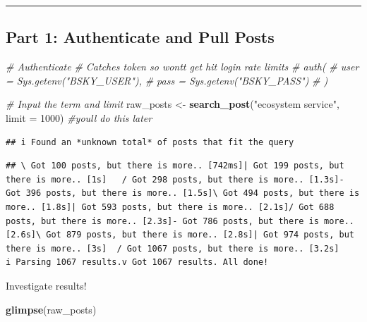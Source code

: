 \documentclass[
]{article}
\newenvironment{Shaded}{\begin{snugshade}}{\end{snugshade}}
\newcommand{\AttributeTok}[1]{\textcolor[rgb]{0.13,0.29,0.53}{#1}}
\newcommand{\CommentTok}[1]{\textcolor[rgb]{0.56,0.35,0.01}{\textit{#1}}}
\newcommand{\DecValTok}[1]{\textcolor[rgb]{0.00,0.00,0.81}{#1}}
\newcommand{\FunctionTok}[1]{\textcolor[rgb]{0.13,0.29,0.53}{\textbf{#1}}}
\newcommand{\NormalTok}[1]{#1}
\newcommand{\OtherTok}[1]{\textcolor[rgb]{0.56,0.35,0.01}{#1}}
\newcommand{\StringTok}[1]{\textcolor[rgb]{0.31,0.60,0.02}{#1}}
\begin{document}
\begin{center}\rule{0.5\linewidth}{0.5pt}\end{center}

\subsection{Part 1: Authenticate and Pull
Posts}\label{part-1-authenticate-and-pull-posts}

\begin{Shaded}
\begin{Highlighting}[]
\CommentTok{\# Authenticate}
\CommentTok{\# Catches token so wont\textquotesingle{}t get hit login rate limits }
\CommentTok{\# auth(}
\CommentTok{\#   user = Sys.getenv("BSKY\_USER"),}
\CommentTok{\#   pass = Sys.getenv("BSKY\_PASS")}
\CommentTok{\#   ) }

\CommentTok{\# Input the term and limit }
\NormalTok{raw\_posts }\OtherTok{\textless{}{-}} \FunctionTok{search\_post}\NormalTok{(}\StringTok{"ecosystem service"}\NormalTok{, }\AttributeTok{limit =} \DecValTok{1000}\NormalTok{) }\CommentTok{\#you\textquotesingle{}ll do this later}
\end{Highlighting}
\end{Shaded}

\begin{verbatim}
## i Found an *unknown total* of posts that fit the query
\end{verbatim}

\begin{verbatim}
## \ Got 100 posts, but there is more.. [742ms]| Got 199 posts, but there is more.. [1s]   / Got 298 posts, but there is more.. [1.3s]- Got 396 posts, but there is more.. [1.5s]\ Got 494 posts, but there is more.. [1.8s]| Got 593 posts, but there is more.. [2.1s]/ Got 688 posts, but there is more.. [2.3s]- Got 786 posts, but there is more.. [2.6s]\ Got 879 posts, but there is more.. [2.8s]| Got 974 posts, but there is more.. [3s]  / Got 1067 posts, but there is more.. [3.2s]                                             i Parsing 1067 results.v Got 1067 results. All done!
\end{verbatim}

Investigate results!

\begin{Shaded}
\begin{Highlighting}[]
\FunctionTok{glimpse}\NormalTok{(raw\_posts)}
\end{Highlighting}
\end{Shaded}
\end{document}
